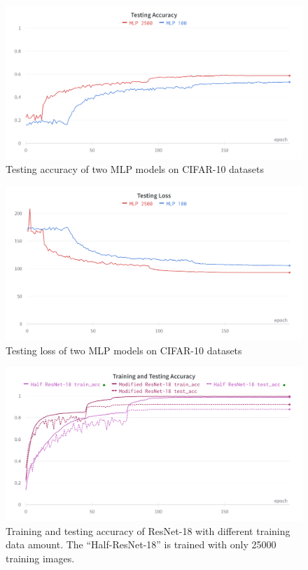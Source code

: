 \documentclass[twocolumn, draft]{extarticle}
\begin{document}
\begin{appendices}
\begin{figure}[H]
\centering
\includegraphics[width=0.9\linewidth]{charts/mlp_cifar_10_test_acc}
\caption{Testing accuracy of two MLP models on CIFAR-10 datasets}
\label{chart: mlp_3}
\end{figure}

\begin{figure}[H]
\centering
\includegraphics[width=0.9\linewidth]{charts/mlp_cifar_10_test_loss}
\caption{Testing loss of two MLP models on CIFAR-10 datasets}
\label{chart: mlp_4}
\end{figure}


\begin{figure}[H]
\centering
\includegraphics[width=0.9\linewidth]{charts/resnet-half-cifar-acc}
\caption{Training and testing accuracy of ResNet-18 with different training data amount. The ``Half-ResNet-18'' is trained with only 25000 training images.}
\label{fig:resnet-half-cifar-acc}
\end{figure}


\end{appendices}
\end{document}
